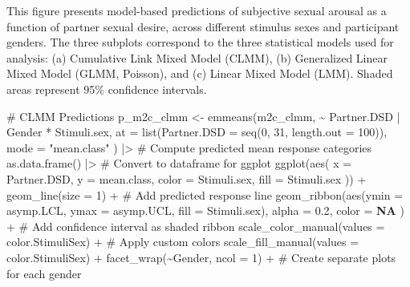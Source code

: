 \documentclass[
  bookmarksnumbered]{article}
\newenvironment{Shaded}{\begin{snugshade}}{\end{snugshade}}
\newcommand{\AttributeTok}[1]{\textcolor[rgb]{0.80,0.80,0.80}{#1}}
\newcommand{\CommentTok}[1]{\textcolor[rgb]{0.50,0.62,0.50}{#1}}
\newcommand{\ConstantTok}[1]{\textcolor[rgb]{0.86,0.64,0.64}{\textbf{#1}}}
\newcommand{\DecValTok}[1]{\textcolor[rgb]{0.86,0.86,0.80}{#1}}
\newcommand{\FloatTok}[1]{\textcolor[rgb]{0.75,0.75,0.82}{#1}}
\newcommand{\FunctionTok}[1]{\textcolor[rgb]{0.94,0.94,0.56}{#1}}
\newcommand{\NormalTok}[1]{\textcolor[rgb]{0.80,0.80,0.80}{#1}}
\newcommand{\OtherTok}[1]{\textcolor[rgb]{0.94,0.94,0.56}{#1}}
\newcommand{\SpecialCharTok}[1]{\textcolor[rgb]{0.86,0.64,0.64}{#1}}
\newcommand{\StringTok}[1]{\textcolor[rgb]{0.80,0.58,0.58}{#1}}
\begin{document}
This figure presents model-based predictions of subjective sexual arousal as a function of partner sexual desire, across different stimulus sexes and participant genders. The three subplots correspond to the three statistical models used for analysis: (a) Cumulative Link Mixed Model (CLMM), (b) Generalized Linear Mixed Model (GLMM, Poisson), and (c) Linear Mixed Model (LMM). Shaded areas represent 95\% confidence intervals.

\begin{Shaded}
\begin{Highlighting}[]
\CommentTok{\# CLMM Predictions}
\NormalTok{p\_m2c\_clmm }\OtherTok{\textless{}{-}} \FunctionTok{emmeans}\NormalTok{(m2c\_clmm, }\SpecialCharTok{\textasciitilde{}}\NormalTok{ Partner.DSD }\SpecialCharTok{|}\NormalTok{ Gender }\SpecialCharTok{*}\NormalTok{ Stimuli.sex,}
  \AttributeTok{at =} \FunctionTok{list}\NormalTok{(}\AttributeTok{Partner.DSD =} \FunctionTok{seq}\NormalTok{(}\DecValTok{0}\NormalTok{, }\DecValTok{31}\NormalTok{, }\AttributeTok{length.out =} \DecValTok{100}\NormalTok{)),}
  \AttributeTok{mode =} \StringTok{"mean.class"}
\NormalTok{) }\SpecialCharTok{|\textgreater{}} \CommentTok{\# Compute predicted mean response categories}
  \FunctionTok{as.data.frame}\NormalTok{() }\SpecialCharTok{|\textgreater{}} \CommentTok{\# Convert to dataframe for ggplot}
  \FunctionTok{ggplot}\NormalTok{(}\FunctionTok{aes}\NormalTok{(}
    \AttributeTok{x =}\NormalTok{ Partner.DSD, }\AttributeTok{y =}\NormalTok{ mean.class,}
    \AttributeTok{color =}\NormalTok{ Stimuli.sex, }\AttributeTok{fill =}\NormalTok{ Stimuli.sex}
\NormalTok{  )) }\SpecialCharTok{+}
  \FunctionTok{geom\_line}\NormalTok{(}\AttributeTok{size =} \DecValTok{1}\NormalTok{) }\SpecialCharTok{+} \CommentTok{\# Add predicted response line}
  \FunctionTok{geom\_ribbon}\NormalTok{(}\FunctionTok{aes}\NormalTok{(}\AttributeTok{ymin =}\NormalTok{ asymp.LCL, }\AttributeTok{ymax =}\NormalTok{ asymp.UCL, }\AttributeTok{fill =}\NormalTok{ Stimuli.sex),}
    \AttributeTok{alpha =} \FloatTok{0.2}\NormalTok{, }\AttributeTok{color =} \ConstantTok{NA}
\NormalTok{  ) }\SpecialCharTok{+} \CommentTok{\# Add confidence interval as shaded ribbon}
  \FunctionTok{scale\_color\_manual}\NormalTok{(}\AttributeTok{values =}\NormalTok{ color.StimuliSex) }\SpecialCharTok{+} \CommentTok{\# Apply custom colors}
  \FunctionTok{scale\_fill\_manual}\NormalTok{(}\AttributeTok{values =}\NormalTok{ color.StimuliSex) }\SpecialCharTok{+}
  \FunctionTok{facet\_wrap}\NormalTok{(}\SpecialCharTok{\textasciitilde{}}\NormalTok{Gender, }\AttributeTok{ncol =} \DecValTok{1}\NormalTok{) }\SpecialCharTok{+} \CommentTok{\# Create separate plots for each gender}

\end{Highlighting}
\end{Shaded}
\end{document}

